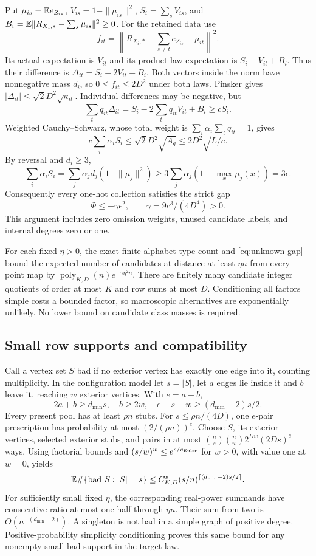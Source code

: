 Put $\mu_{is}=\mathbb E e_{Z_{is}}$, $V_{is}=1-\|\mu_{is}\|^2$,
$S_i=\sum_sV_{is}$, and
$B_i=\mathbb E\|R_{X_i,*}-\sum_s\mu_{is}\|^2\ge0$.
For the retained data use
\[
 f_{it}=\left\|R_{X_i,*}-\sum_{s\ne t}e_{Z_{is}}-\mu_{it}\right\|^2.
\]
Its actual expectation is $V_{it}$ and its product-law expectation is
$S_i-V_{it}+B_i$. Thus their difference is
$\Delta_{it}=S_i-2V_{it}+B_i$.
Both vectors inside the norm have nonnegative mass $d_i$, so
$0\le f_{it}\le2D^2$ under both laws. Pinsker gives
$|\Delta_{it}|\le\sqrt2D^2\sqrt{\kappa_{it}}$.
Individual differences may be negative, but
\[
 \sum_tq_{it}\Delta_{it}
 =S_i-2\sum_tq_{it}V_{it}+B_i\ge cS_i.
\]
Weighted Cauchy--Schwarz, whose total weight is
$\sum_i\alpha_i\sum_tq_{it}=1$, gives
\[
 c\sum_i\alpha_iS_i
 \le\sqrt2D^2\sqrt{A_q}\le2D^2\sqrt{L/c}.
\]
By reversal and $d_i\ge3$,
\[
 \sum_i\alpha_iS_i
 =\sum_j\alpha_jd_j(1-\|\mu_j\|^2)
 \ge3\sum_j\alpha_j(1-\max_x\mu_j(x))=3\epsilon.
\]
Consequently every one-hot collection satisfies the strict gap
\begin{equation}\label{eq:unknown-gap}
 \Phi\le-\gamma\epsilon^2,\qquad \gamma=9c^3/(4D^4)>0.
\end{equation}
This argument includes zero omission weights, unused candidate labels,
and internal degrees zero or one.

For each fixed $\eta>0$, the exact finite-alphabet type count and
\eqref{eq:unknown-gap} bound the expected number of candidates at
distance at least $\eta n$ from every point map by
$\operatorname{poly}_{K,D}(n)e^{-\gamma\eta^2n}$.
There are finitely many candidate integer quotients of order at most
$K$ and row sums at most $D$. Conditioning all factors simple costs a
bounded factor, so macroscopic alternatives are exponentially unlikely.
No lower bound on candidate class masses is required.

\subsection{Small row supports and compatibility}
Call a vertex set $S$ bad if no exterior vertex has exactly one edge
into it, counting multiplicity. In the configuration model let
$s=|S|$, let $a$ edges lie inside it and $b$ leave it, reaching
$w$ exterior vertices. With $e=a+b$,
\[
 2a+b\ge d_{\min}s,\quad b\ge2w,\quad
 e-s-w\ge(d_{\min}-2)s/2.
\]
Every present pool has at least $\rho n$ stubs. For
$s\le\rho n/(4D)$, one $e$-pair prescription has probability at most
$(2/(\rho n))^e$. Choose $S$, its exterior vertices, selected exterior
stubs, and pairs in at most
$\binom ns\binom nw2^{Dw}(2Ds)^e$ ways.
Using factorial bounds and $(s/w)^w\le e^{s/e_{\rm Euler}}$ for
$w>0$, with value one at $w=0$, yields
\begin{equation}\label{eq:unknown-support}
 \mathbb E\#\{\text{bad }S:|S|=s\}
 \le C_{K,D}^s(s/n)^{\lceil(d_{\min}-2)s/2\rceil}.
\end{equation}
For sufficiently small fixed $\eta$, the corresponding real-power
summands have consecutive ratio at most one half through $\eta n$.
Their sum from two is $O(n^{-(d_{\min}-2)})$.
A singleton is not bad in a simple graph of positive degree.
Positive-probability simplicity conditioning proves this same bound
for any nonempty small bad support in the target law.

